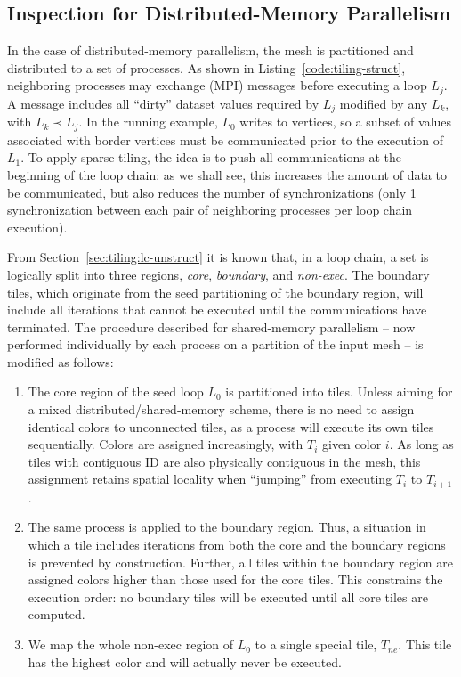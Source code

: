 \subsection*{Inspection for Distributed-Memory Parallelism}
In the case of distributed-memory parallelism, the mesh is partitioned and distributed to a set of processes. As shown in Listing~\ref{code:tiling-struct}, neighboring processes may exchange (MPI) messages before executing a loop $L_j$. A message includes all ``dirty'' dataset values required by $L_j$ modified by any $L_k$, with $L_k \prec L_j$. In the running example, $L_0$ writes to vertices, so a subset of values associated with border vertices must be communicated prior to the execution of $L_1$. To apply sparse tiling, the idea is to push all communications at the beginning of the loop chain: as we shall see, this increases the amount of data to be communicated, but also reduces  the number of synchronizations (only 1 synchronization between each pair of neighboring processes per loop chain execution).

From Section~\ref{sec:tiling:lc-unstruct} it is known that, in a loop chain, a set is logically split into three regions, \textit{core}, \textit{boundary}, and \textit{non-exec}. The boundary tiles, which originate from the seed partitioning of the boundary region, will include all iterations that cannot be executed until the communications have terminated. The procedure described for shared-memory parallelism -- now performed individually by each process on a partition of the input mesh -- is modified as follows:
\begin{enumerate}
\item The core region of the seed loop $L_0$ is partitioned into tiles. Unless aiming for a mixed distributed/shared-memory scheme, there is no need to assign identical colors to unconnected tiles, as a process will execute its own tiles sequentially. Colors are assigned increasingly, with $T_i$ given color $i$. As long as tiles with contiguous ID are also physically contiguous in the mesh, this assignment retains spatial locality when ``jumping'' from executing $T_i$ to $T_{i+1}$.
\item The same process is applied to the boundary region. Thus, a situation in which a tile includes iterations from both the core and the boundary regions is prevented by construction. Further, all tiles within the boundary region are assigned colors higher than those used for the core tiles. This constrains the execution order: no boundary tiles will be executed until all core tiles are computed.
\item We map the whole non-exec region of $L_0$ to a single special tile, $T_{ne}$. This tile has the highest color and will actually never be executed. 
\end{enumerate}

